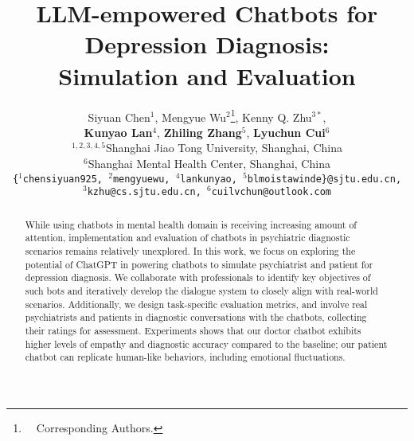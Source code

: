 \documentclass[11pt]{article}
\title{LLM-empowered Chatbots for Depression Diagnosis: \\Simulation and Evaluation}
\author{Siyuan Chen$^1$, Mengyue Wu$^2$\thanks{~~Corresponding Authors.}, Kenny Q. Zhu$^{3*}$,  \\ 
{\bf Kunyao Lan$^4$}, {\bf Zhiling Zhang$^5$}, {\bf Lyuchun Cui$^6$} \\
$^{1,2,3,4,5}$Shanghai Jiao Tong University, Shanghai, China \\
$^{6}$Shanghai Mental Health Center, Shanghai, China \\
\texttt{\{$^1$chensiyuan925, $^2$mengyuewu, $^4$lankunyao, $^5$blmoistawinde\}@sjtu.edu.cn,}\\
\texttt{$^3$kzhu@cs.sjtu.edu.cn, $^6$cuilvchun@outlook.com}
}
\newcommand{\KZ}[1]{\textcolor{blue}{(Kenny: #1})}
\newcommand{\MY}[1]{\textcolor{red}{(Mengyue: #1})}
\begin{document}
\maketitle
\begin{abstract}
While using chatbots in mental health domain is receiving increasing amount of attention, implementation and evaluation of chatbots in psychiatric diagnostic scenarios remains relatively unexplored.
In this work, we focus on exploring the potential of ChatGPT in powering chatbots to simulate psychiatrist and patient for depression diagnosis. 
We collaborate with professionals to identify key objectives of such bots and iteratively develop the dialogue system to closely align with real-world scenarios. 
Additionally, we design task-specific evaluation metrics, and involve real psychiatrists and patients in diagnostic conversations with the chatbots, collecting their ratings for assessment.
Experiments shows that our doctor chatbot exhibits higher levels of empathy and diagnostic accuracy compared to the baseline; our patient chatbot can replicate human-like behaviors, including emotional fluctuations.

\end{abstract}




% 











\appendix



\end{document}
